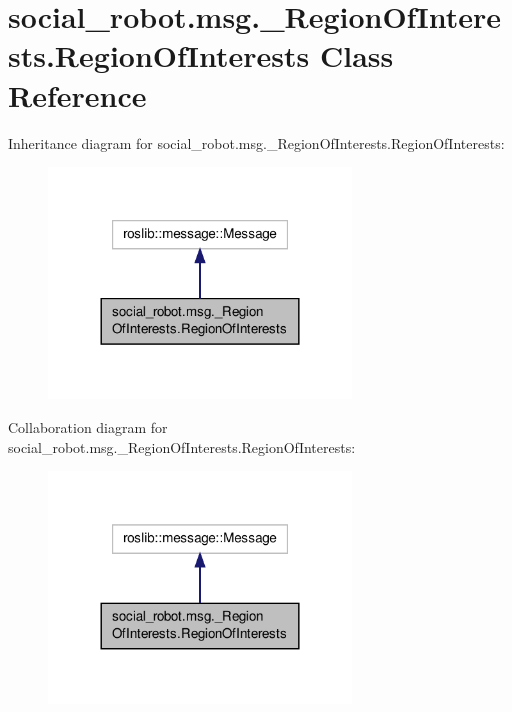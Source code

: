 \hypertarget{classsocial__robot_1_1msg_1_1__RegionOfInterests_1_1RegionOfInterests}{\section{social\-\_\-robot.\-msg.\-\_\-\-Region\-Of\-Interests.\-Region\-Of\-Interests Class Reference}
\label{classsocial__robot_1_1msg_1_1__RegionOfInterests_1_1RegionOfInterests}
}


Inheritance diagram for social\-\_\-robot.\-msg.\-\_\-\-Region\-Of\-Interests.\-Region\-Of\-Interests\-:
\nopagebreak
\begin{figure}[H]
\begin{center}
\leavevmode
\includegraphics[width=228pt]{classsocial__robot_1_1msg_1_1__RegionOfInterests_1_1RegionOfInterests__inherit__graph}
\end{center}
\end{figure}


Collaboration diagram for social\-\_\-robot.\-msg.\-\_\-\-Region\-Of\-Interests.\-Region\-Of\-Interests\-:
\nopagebreak
\begin{figure}[H]
\begin{center}
\leavevmode
\includegraphics[width=228pt]{classsocial__robot_1_1msg_1_1__RegionOfInterests_1_1RegionOfInterests__coll__graph}
\end{center}
\end{figure}
